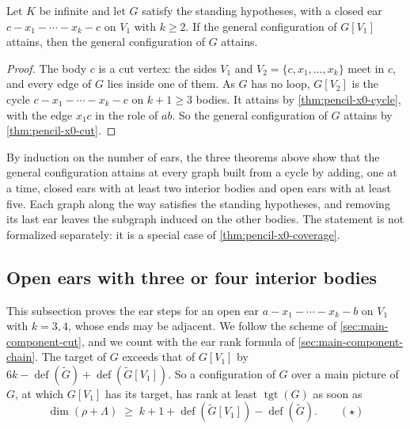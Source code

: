 \begin{theorem}
  \label{thm:pencil-x0-closed-ear}
  \leanok
  Let $K$ be infinite and let $G$ satisfy the standing hypotheses, with a
  closed ear $c - x_1 - \cdots - x_k - c$ on $V_1$ with $k \ge 2$. If the
  general configuration of $G[V_1]$ attains, then the general
  configuration of $G$ attains.
\end{theorem}
\begin{proof}
  \leanok
  The body $c$ is a cut vertex: the sides $V_1$ and
  $V_2 = \{c, x_1, \dots, x_k\}$ meet in $c$, and every edge of $G$ lies
  inside one of them. As $G$ has no loop, $G[V_2]$ is the cycle
  $c - x_1 - \cdots - x_k - c$ on $k + 1 \ge 3$ bodies. It attains by
  \cref{thm:pencil-x0-cycle}, with the edge $x_1 c$ in the role of $ab$.
  So the general configuration of $G$ attains by
  \cref{thm:pencil-x0-cut}.
\end{proof}

\begin{remark}
  \label{rem:pencil-x0-ear-class}
  By induction on the number of ears, the three theorems above show that
  the general configuration attains at every graph built from a cycle by
  adding, one at a time, closed ears with at least two interior bodies
  and open ears with at least five. Each graph along the way satisfies
  the standing hypotheses, and removing its last ear leaves the subgraph
  induced on the other bodies. The statement is not formalized
  separately: it is a special case of \cref{thm:pencil-x0-coverage}.
\end{remark}

\subsection{Open ears with three or four interior bodies}
\label{sec:main-component-short}

This subsection proves the ear steps for an open ear
$a - x_1 - \cdots - x_k - b$ on $V_1$ with $k = 3, 4$, whose ends may
be adjacent. We follow the scheme of \cref{sec:main-component-cut}, and
we count with the ear rank formula of \cref{sec:main-component-chain}.
The target of $G$ exceeds that of $G[V_1]$ by
$6k - \operatorname{def}(\tilde G) + \operatorname{def}(\tilde G[V_1])$.
So a configuration of $G$ over a main picture of $G$, at which $G[V_1]$
has its target, has rank at least $\operatorname{tgt}(G)$ as soon as
\[
  \dim(\rho + \Lambda) \;\ge\; k + 1 + \operatorname{def}(\tilde G[V_1])
  - \operatorname{def}(\tilde G). \qquad (\star)
\]

